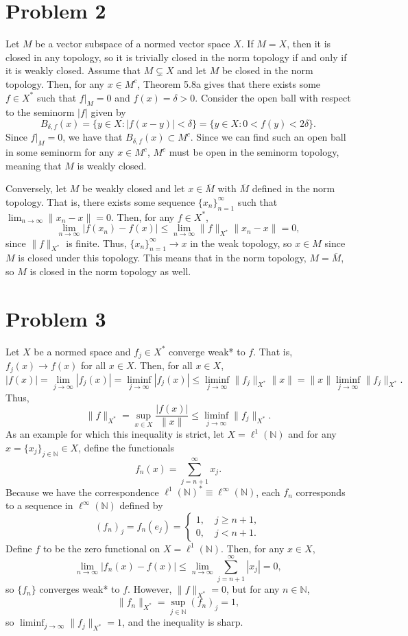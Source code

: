 \documentclass{article}
\begin{document}
\section{Problem 2}
Let $M$ be a vector subspace of a normed vector space $X$. If $M=X$, then it is closed in any topology, so it is trivially closed in the norm topology if and only if it is weakly closed. Assume that $M\subsetneq X$ and let $M$ be closed in the norm topology. Then, for any $x\in M^c$, Theorem 5.8a gives that there exists some $f\in X^*$ such that $f\big|_M=0$ and $f(x)=\delta>0$. Consider the open ball with respect to the seminorm $|f|$ given by
\[
B_{\delta,f}(x)=\{y\in X:|f(x-y)|<\delta\}=\{y\in X:0<f(y)<2\delta\}.
\]
Since $f\big|_M=0$, we have that $B_{\delta,f}(x)\subset M^c$. Since we can find such an open ball in some seminorm for any $x\in M^c$, $M^c$ must be open in the seminorm topology, meaning that $M$ is weakly closed.

Conversely, let $M$ be weakly closed and let $x\in\overline{M}$ with $\overline{M}$ defined in the norm topology. That is, there exists some sequence $\{x_n\}_{n=1}^\infty$ such that $\lim_{n\to\infty}\|x_n-x\|=0$. Then, for any $f\in X^*$, 
\[
\lim_{n\to\infty}|f(x_n)-f(x)|\leq\lim_{n\to\infty}\|f\|_{X^*}\|x_n-x\|=0,
\]
since $\|f\|_{X^*}$ is finite. Thus, $\{x_n\}_{n=1}^\infty\to x$ in the weak topology, so $x\in M$ since $M$ is closed under this topology. This means that in the norm topology, $M=\overline{M}$, so $M$ is closed in the norm topology as well. 

\section{Problem 3}
Let $X$ be a normed space and $f_j\in X^*$ converge weak* to $f$. That is, $f_j(x)\to f(x)$ for all $x\in X$. Then, for all $x\in X$,
\[
|f(x)|=\lim_{j\to\infty}|f_j(x)|=\liminf_{j\to\infty}|f_j(x)|\leq\liminf_{j\to\infty}\|f_j\|_{X^*}\|x\|=\|x\|\liminf_{j\to\infty}\|f_j\|_{X^*}.
\]
Thus,
\[
\|f\|_{X^*}=\sup_{x\in X}\frac{|f(x)|}{\|x\|}\leq\liminf_{j\to\infty}\|f_j\|_{X^*}.
\]
As an example for which this inequality is strict, let $X=\ell^1(\mathbb{N})$ and for any $x=\{x_j\}_{j\in\mathbb{N}}\in X$, define the functionals
\[
f_n(x)=\sum_{j=n+1}^\infty x_j.
\]
Because we have the correspondence $\ell^1(\mathbb{N})^*\equiv\ell^\infty(\mathbb{N})$, each $f_n$ corresponds to a sequence in $\ell^\infty(\mathbb{N})$ defined by
\[
(f_n)_j=f_n(e_j)=\begin{cases}
	1,\quad j\geq n+1,\\
	0,\quad j<n+1.
\end{cases}
\]
Define $f$ to be the zero functional on $X=\ell^1(\mathbb{N})$. Then, for any $x\in X$,
\[
\lim_{n\to\infty}|f_n(x)-f(x)|\leq\lim_{n\to\infty}\sum_{j=n+1}^\infty|x_j|=0,
\]
so $\{f_n\}$ converges weak* to $f$. However, $\|f\|_{X^*}=0$, but for any $n\in\mathbb{N}$,
\[
\|f_n\|_{X^*}=\sup_{j\in\mathbb{N}}(f_n)_j=1,
\]
so $\liminf_{j\to\infty}\|f_j\|_{X^*}=1$, and the inequality is sharp.
\end{document}
